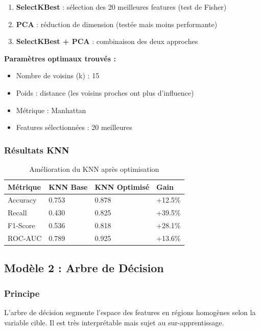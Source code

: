 \documentclass[11pt,a4paper]{article}
\begin{document}
\begin{enumerate}
    \item \textbf{SelectKBest} : sélection des 20 meilleures features (test de Fisher)
    \item \textbf{PCA} : réduction de dimension (testée mais moins performante)
    \item \textbf{SelectKBest + PCA} : combinaison des deux approches
\end{enumerate}

\textbf{Paramètres optimaux trouvés :}
\begin{itemize}
    \item Nombre de voisins (k) : 15
    \item Poids : distance (les voisins proches ont plus d'influence)
    \item Métrique : Manhattan
    \item Features sélectionnées : 20 meilleures
\end{itemize}

\subsubsection{Résultats KNN}
\begin{table}[H]
\centering
\begin{tabular}{L{3cm} C{3cm} C{3cm} C{2cm}}
\toprule
\textbf{Métrique} & \textbf{KNN Base} & \textbf{KNN Optimisé} & \textbf{Gain} \\
\midrule
Accuracy & 0.753 & 0.878 & +12.5\% \\
Recall & 0.430 & 0.825 & +39.5\% \\
F1-Score & 0.536 & 0.818 & +28.1\% \\
ROC-AUC & 0.789 & 0.925 & +13.6\% \\
\bottomrule
\end{tabular}
\caption{Amélioration du KNN après optimisation}
\end{table}

\subsection{Modèle 2 : Arbre de Décision}

\subsubsection{Principe}
L'arbre de décision segmente l'espace des features en régions homogènes selon la 
variable cible. Il est très interprétable mais sujet au sur-apprentissage.
\end{document}
